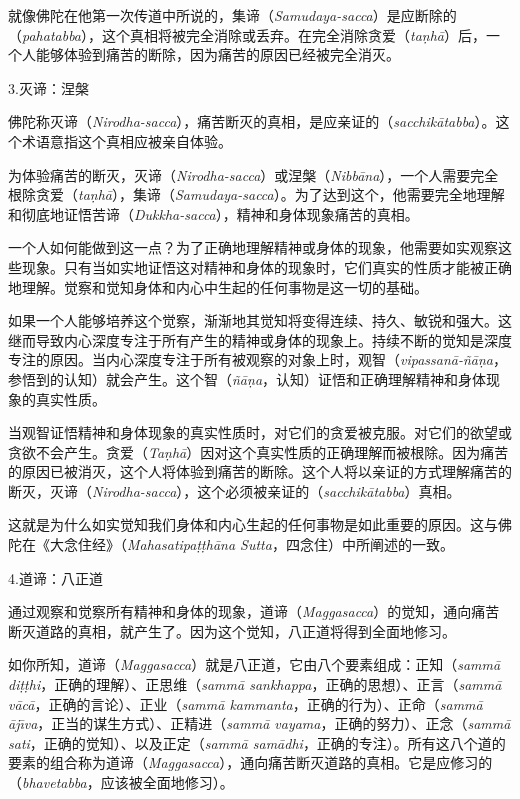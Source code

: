 就像佛陀在他第一次传道中所说的，集谛（{\it Samudaya-sacca}）是应断除的（{\it pahatabba}），这个真相将被完全消除或丢弃。在完全消除贪爱（{\it ta\d nh\=a}）后，一个人能够体验到痛苦的断除，因为痛苦的原因已经被完全消灭。

\sssubsectnon 3.灭谛：涅槃

佛陀称灭谛（{\it Nirodha-sacca}），痛苦断灭的真相，是应亲证的（{\it sacchik\=atabba}）。这个术语意指这个真相应被亲自体验。

为体验痛苦的断灭，灭谛（{\it Nirodha-sacca}）或涅槃（{\it Nibb\=ana}），一个人需要完全根除贪爱（{\it ta\d nh\=a}），集谛（{\it Samudaya-sacca}）。为了达到这个，他需要完全地理解和彻底地证悟苦谛（{\it Dukkha-sacca}），精神和身体现象痛苦的真相。

一个人如何能做到这一点？为了正确地理解精神或身体的现象，他需要如实观察这些现象。只有当如实地证悟这对精神和身体的现象时，它们真实的性质才能被正确地理解。觉察和觉知身体和内心中生起的任何事物是这一切的基础。

如果一个人能够培养这个觉察，渐渐地\1其觉知将变得连续、持久、敏锐和强大。这继而导致内心深度专注于所有产生的精神或身体的现象上。持续不断的觉知是深度专注的原因。当内心深度专注于所有被观察的对象上时，观智（{\it vipassan\=a-\~n\=a\d na}，参悟到的认知）就会产生。这个智（{\it \~n\=a\d na}，认知）证悟和正确理解精神和身体现象的真实性质。

当观智证悟精神和身体现象的真实性质时，对它们的贪爱被克服。对它们的欲望或贪欲不会产生。贪爱（{\it Ta\d nh\=a}）因对这个真实性质的正确理解而被根除。因为痛苦的原因已被消灭，这个人将体验到痛苦的断除。这个人将以亲证的方式理解痛苦的断灭，灭谛（{\it Nirodha-sacca}），这个必须被亲证的（{\it sacchik\=atabba}）真相。

这就是为什么如实觉知我们身体和内心生起的任何事物是如此重要的原因。这与佛陀在《大念住经》（{\it Mahasatipa\d t\d th\=ana Sutta}，四念住）中所阐述的一致。

\sssubsectnon 4.道谛：八正道

通过观察和觉察所有精神和身体的现象，道谛（{\it Maggasacca}）的觉知，通向痛苦断灭道路的真相，就产生了。因为这个觉知，八正道将得到全面地修习。

如你所知，道谛（{\it Maggasacca}）就是八正道，它由八个要素组成：\1正知（{\it samm\=a di\d t\d thi}，正确的理解）、正思维（{\it samm\=a sankhappa}，正确的思想）、正言（{\it samm\=a v\=ac\=a}，正确的言论）、正业（{\it samm\=a kammanta}，正确的行为）、正命（{\it samm\=a \=aj\=\i va}，正当的谋生方式）、正精进（{\it samm\=a vayama}，正确的努力）、正念（{\it samm\=a sati}，正确的觉知）、以及正定（{\it samm\=a sam\=adhi}，正确的专注）。所有这八个道的要素的组合称为道谛（{\it Maggasacca}），通向痛苦断灭道路的真相。它是应修习的（{\it bhavetabba}，应该被全面地修习）。

